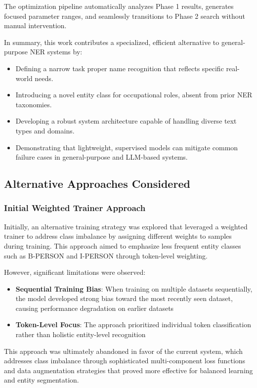\documentclass[a4paper]{usiinfbachelorproject}
\begin{document}
The optimization pipeline automatically analyzes Phase 1 results, generates focused parameter ranges, and seamlessly transitions to Phase 2 search without manual intervention.

\vspace{1em}
\noindent
In summary, this work contributes a specialized, efficient alternative to general-purpose NER systems by:
\begin{itemize}
  \item Defining a narrow task proper name recognition that reflects specific real-world needs.
  \item Introducing a novel entity class for occupational roles, absent from prior NER taxonomies.
  \item Developing a robust system architecture capable of handling diverse text types and domains.
  \item Demonstrating that lightweight, supervised models can mitigate common failure cases in general-purpose and LLM-based systems.
\end{itemize}

   \subsection{Alternative Approaches Considered}

\subsubsection{Initial Weighted Trainer Approach}
Initially, an alternative training strategy was explored that leveraged a weighted trainer to address class imbalance by assigning different weights to samples during training. This approach aimed to emphasize less frequent entity classes such as B-PERSON and I-PERSON through token-level weighting.

However, significant limitations were observed:
\begin{itemize}
    \item \textbf{Sequential Training Bias}: When training on multiple datasets sequentially, the model developed strong bias toward the most recently seen dataset, causing performance degradation on earlier datasets
    \item \textbf{Token-Level Focus}: The approach prioritized individual token classification rather than holistic entity-level recognition
\end{itemize}

This approach was ultimately abandoned in favor of the current system, which addresses class imbalance through sophisticated multi-component loss functions and data augmentation strategies that proved more effective for balanced learning and entity segmentation.
\end{document}
